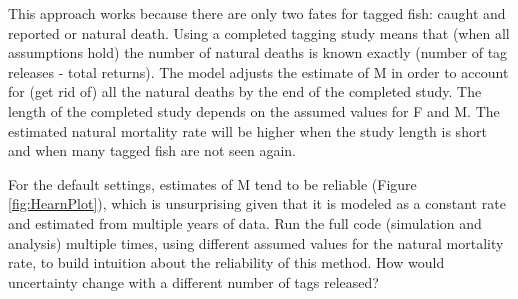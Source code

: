 \documentclass[
]{krantz}
\makeatletter
\newenvironment{Shaded}{\begin{snugshade}}{\end{snugshade}}
\newcommand{\AttributeTok}[1]{\textcolor[rgb]{0.27,0.27,0.27}{#1}}
\newcommand{\CommentTok}[1]{\textcolor[rgb]{0.37,0.37,0.37}{\textit{#1}}}
\newcommand{\DecValTok}[1]{\textcolor[rgb]{0.06,0.06,0.06}{#1}}
\newcommand{\FunctionTok}[1]{\textcolor[rgb]{0.27,0.27,0.27}{\textbf{#1}}}
\newcommand{\NormalTok}[1]{#1}
\newcommand{\OtherTok}[1]{\textcolor[rgb]{0.37,0.37,0.37}{#1}}
\newcommand{\SpecialCharTok}[1]{\textcolor[rgb]{0.43,0.43,0.43}{\textbf{#1}}}
\newcommand{\StringTok}[1]{\textcolor[rgb]{0.5,0.5,0.5}{#1}}
\newenvironment{kframe}{%
\medskip{}
\setlength{\fboxsep}{.8em}
 \def\at@end@of@kframe{}%
 \ifinner\ifhmode%
  \def\at@end@of@kframe{\end{minipage}}%
  \begin{minipage}{\columnwidth}%
 \fi\fi%
 \def\FrameCommand##1{\hskip\@totalleftmargin \hskip-\fboxsep
 \colorbox{shadecolor}{##1}\hskip-\fboxsep
     \hskip-\linewidth \hskip-\@totalleftmargin \hskip\columnwidth}%
 \MakeFramed {\advance\hsize-\width
   \@totalleftmargin\z@ \linewidth\hsize
   \@setminipage}}%
 {\par\unskip\endMakeFramed%
 \at@end@of@kframe}
\renewenvironment{Shaded}{\begin{kframe}}{\end{kframe}}
\makeatother
\begin{document}
\begin{Shaded}
\end{Shaded}

This approach works because there are only two fates for tagged fish: caught and reported or natural death. Using a completed tagging study means that (when all assumptions hold) the number of natural deaths is known exactly (number of tag releases - total returns). The model adjusts the estimate of M in order to account for (get rid of) all the natural deaths by the end of the completed study. The length of the completed study depends on the assumed values for F and M. The estimated natural mortality rate will be higher when the study length is short and when many tagged fish are not seen again.

For the default settings, estimates of M tend to be reliable (Figure \ref{fig:HearnPlot}), which is unsurprising given that it is modeled as a constant rate and estimated from multiple years of data. Run the full code (simulation and analysis) multiple times, using different assumed values for the natural mortality rate, to build intuition about the reliability of this method. How would uncertainty change with a different number of tags released?
\end{document}
